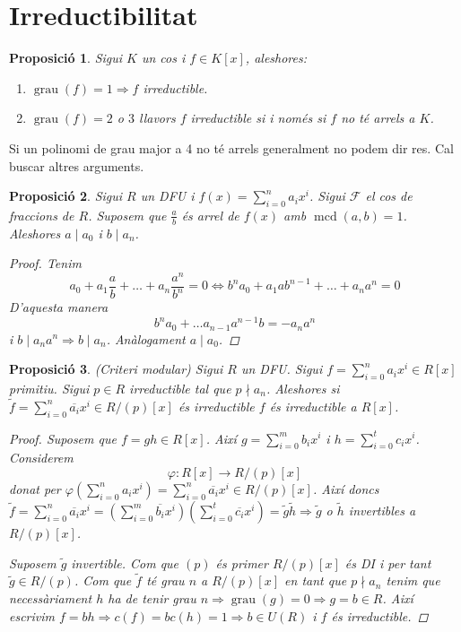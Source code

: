 \documentclass[a4paper,11pt]{report}
\renewcommand{\div}{\mid}
\DeclareMathOperator{\mcd}{mcd}
\DeclareMathOperator{\grau}{grau}
\renewcommand{\bar}{\overline}
\renewcommand{\implies}{\Leftrightarrow}
\newcommand{\im}{\Rightarrow}
\theoremstyle{theorem}
\newtheorem{proposicio}{\normalfont \sffamily\bfseries Proposició}[section]
\theoremstyle{definition}
\begin{document}
\section{Irreductibilitat}
\begin{proposicio}
	Sigui $K$ un cos i $f\in K[x]$, aleshores:\begin{enumerate}
		\item $\grau(f)=1\im f$ irreductible.
		\item$\grau(f)=2$ o $3$ llavors $f$ irreductible si i només si $f$ no té arrels a $K$.
	\end{enumerate}
\end{proposicio}
Si un polinomi de grau major a 4 no té arrels generalment no podem dir res. Cal buscar altres arguments.
\begin{proposicio}
	Sigui $R$ un DFU i $f(x)=\sum_{i=0}^{n}a_ix^i$. Sigui $\mathcal{F}$ el cos de fraccions de $R$. Suposem que $\tfrac{a}{b}$ és arrel de $f(x)$ amb $\mcd(a,b)=1$. Aleshores $a\div a_0$ i $b\div a_n$.
	\begin{proof}
		Tenim $$a_0+a_1\frac{a}{b}+\ldots+a_n\frac{a^n}{b^n}=0\implies b^na_0+a_1ab^{n-1}+\ldots+a_na^n =0$$
		D'aquesta manera $$b^n a_0+\ldots a_{n-1}a^{n-1}b=-a_na^n$$
		i $b\div a_na^n\im b\div a_n$. Anàlogament $a\div a_0$.
	\end{proof}
\end{proposicio}
\begin{proposicio}(Criteri modular)
	Sigui $R$ un DFU. Sigui $f=\sum_{i=0}^{n}a_ix^i\in R[x]$ primitiu. Sigui $p\in R$ irreductible tal que $p\nmid a_n$. Aleshores si $\tilde{f}=\sum_{i=0}^{n}\bar{a_i}x^i\in R/(p)[x]$ és irreductible $f$ és irreductible a $R[x]$.\begin{proof}
		Suposem que $f=gh\in R[x]$. Així $g=\sum_{i=0}^{m}b_ix^i$ i $h=\sum_{i=0}^{t}c_ix^i$. Considerem $$\varphi: R[x]\longrightarrow R/(p)[x]$$ donat per $\varphi(\sum_{i=0}^{n}a_ix^i)=\sum_{i=0}^{n}\bar{a_i}x^i\in R/(p)[x]$. Així doncs $\tilde{f}=\sum_{i=0}^{n}\bar{a_i}x^i=(\sum_{i=0}^{m}\bar{b_i}x^i)(\sum_{i=0}^{t}\bar{c_i}x^i)=\tilde{g}\tilde{h}\im \tilde{g}$ o $\tilde{h}$ invertibles a $R/(p)[x]$. 
		
		Suposem $\tilde{g}$ invertible. Com que $(p)$ és primer $R/(p)[x]$ és DI i per tant $\tilde{g}\in R/(p)$. Com que $\tilde{f}$ té grau $n$ a $R/(p)[x]$ en tant que $p\nmid a_n$ tenim que necessàriament $h$ ha de tenir grau $n\im\grau(g)=0\im g=b\in R$. Així escrivim $f=bh\im c(f)=bc(h)=1\im b\in U(R)$ i $f$ és irreductible.
	\end{proof}
\end{proposicio}
\end{document}
